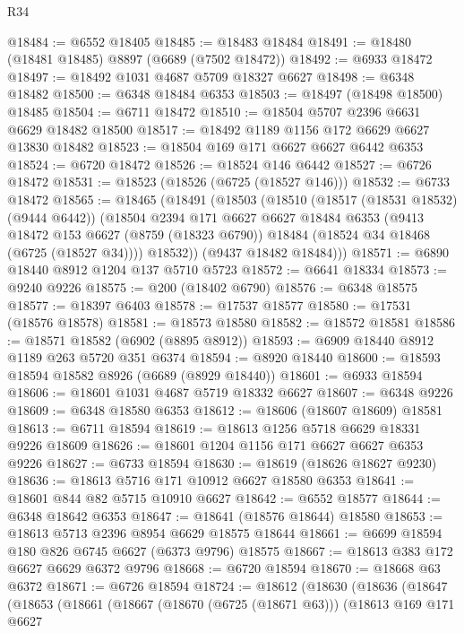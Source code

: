 \begin{lexlean}{R34}
\begin{coremodule}
@18484 := @6552 @18405
@18485 := @18483 @18484
@18491 := @18480 (@18481 @18485) @8897 (@6689 (@7502 @18472))
@18492 := @6933 @18472
@18497 := @18492 @1031 @4687 @5709 @18327 @6627
@18498 := @6348 @18482
@18500 := @6348 @18484 @6353
@18503 := @18497 (@18498 @18500) @18485
@18504 := @6711 @18472
@18510 := @18504 @5707 @2396 @6631 @6629 @18482 @18500
@18517 := @18492 @1189 @1156 @172 @6629 @6627 @13830 @18482
@18523 := @18504 @169 @171 @6627 @6627 @6442 @6353
@18524 := @6720 @18472
@18526 := @18524 @146 @6442
@18527 := @6726 @18472
@18531 := @18523 (@18526 (@6725 (@18527 @146)))
@18532 := @6733 @18472
@18565 := @18465
    (@18491
      (@18503
        (@18510
          (@18517 (@18531 @18532) (@9444 @6442))
          (@18504
            @2394
            @171
            @6627
            @6627
            @18484
            @6353
            (@9413
              @18472
              @153
              @6627
              (@8759 (@18323 @6790))
              @18484
              (@18524 @34 @18468 (@6725 (@18527 @34))))
            @18532))
        (@9437 @18482 @18484)))
@18571 := @6890 @18440 @8912 @1204 @137 @5710 @5723
@18572 := @6641 @18334
@18573 := @9240 @9226
@18575 := @200 (@18402 @6790)
@18576 := @6348 @18575
@18577 := @18397 @6403
@18578 := @17537 @18577
@18580 := @17531 (@18576 @18578)
@18581 := @18573 @18580
@18582 := @18572 @18581
@18586 := @18571 @18582 (@6902 (@8895 @8912))
@18593 := @6909 @18440 @8912 @1189 @263 @5720 @351 @6374
@18594 := @8920 @18440
@18600 := @18593 @18594 @18582 @8926 (@6689 (@8929 @18440))
@18601 := @6933 @18594
@18606 := @18601 @1031 @4687 @5719 @18332 @6627
@18607 := @6348 @9226
@18609 := @6348 @18580 @6353
@18612 := @18606 (@18607 @18609) @18581
@18613 := @6711 @18594
@18619 := @18613 @1256 @5718 @6629 @18331 @9226 @18609
@18626 := @18601 @1204 @1156 @171 @6627 @6627 @6353 @9226
@18627 := @6733 @18594
@18630 := @18619 (@18626 @18627 @9230)
@18636 := @18613 @5716 @171 @10912 @6627 @18580 @6353
@18641 := @18601 @844 @82 @5715 @10910 @6627
@18642 := @6552 @18577
@18644 := @6348 @18642 @6353
@18647 := @18641 (@18576 @18644) @18580
@18653 := @18613 @5713 @2396 @8954 @6629 @18575 @18644
@18661 := @6699 @18594 @180 @826 @6745 @6627 (@6373 @9796) @18575
@18667 := @18613 @383 @172 @6627 @6629 @6372 @9796
@18668 := @6720 @18594
@18670 := @18668 @63 @6372
@18671 := @6726 @18594
@18724 := @18612
    (@18630
      (@18636
        (@18647
          (@18653
            (@18661
              (@18667
                (@18670 (@6725 (@18671 @63)))
                (@18613
                  @169
                  @171
                  @6627

\end{coremodule}
\end{lexlean}
